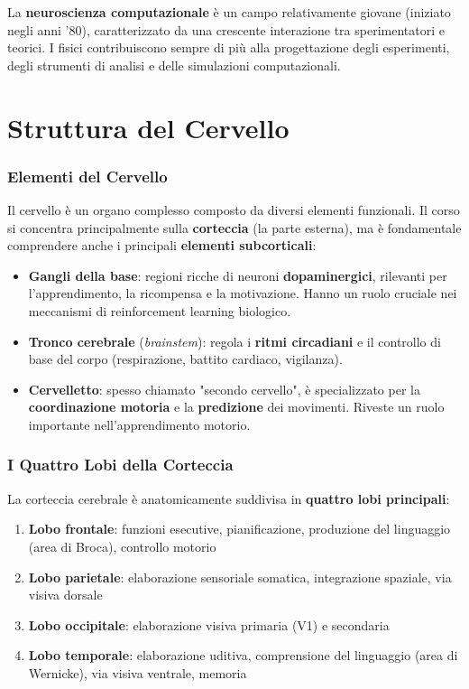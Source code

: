 La \textbf{neuroscienza computazionale} è un campo relativamente giovane (iniziato negli anni '80), caratterizzato da una crescente interazione tra sperimentatori e teorici. I fisici contribuiscono sempre di più alla progettazione degli esperimenti, degli strumenti di analisi e delle simulazioni computazionali.


\newpage

\section{Struttura del Cervello}

\subsubsection{Elementi del Cervello}

Il cervello è un organo complesso composto da diversi elementi funzionali. Il corso si concentra principalmente sulla \textbf{corteccia} (la parte esterna), ma è fondamentale comprendere anche i principali \textbf{elementi subcorticali}:

\begin{itemize}
    \item \textbf{Gangli della base}: regioni ricche di neuroni \textbf{dopaminergici}, rilevanti per l'apprendimento, la ricompensa e la motivazione. Hanno un ruolo cruciale nei meccanismi di reinforcement learning biologico.
    \item \textbf{Tronco cerebrale} (\textit{brainstem}): regola i \textbf{ritmi circadiani} e il controllo di base del corpo (respirazione, battito cardiaco, vigilanza).
    \item \textbf{Cervelletto}: spesso chiamato "secondo cervello", è specializzato per la \textbf{coordinazione motoria} e la \textbf{predizione} dei movimenti. Riveste un ruolo importante nell'apprendimento motorio.
\end{itemize}

\subsubsection{I Quattro Lobi della Corteccia}

La corteccia cerebrale è anatomicamente suddivisa in \textbf{quattro lobi principali}:

\begin{enumerate}
    \item \textbf{Lobo frontale}: funzioni esecutive, pianificazione, produzione del linguaggio (area di Broca), controllo motorio
    \item \textbf{Lobo parietale}: elaborazione sensoriale somatica, integrazione spaziale, via visiva dorsale
    \item \textbf{Lobo occipitale}: elaborazione visiva primaria (V1) e secondaria
    \item \textbf{Lobo temporale}: elaborazione uditiva, comprensione del linguaggio (area di Wernicke), via visiva ventrale, memoria
\end{enumerate}

